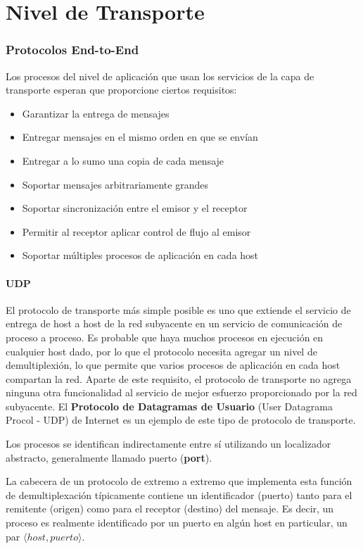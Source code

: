 \part{Nivel de Transporte}
\section{Protocolos End-to-End}
Los procesos del nivel de aplicación que usan los servicios de la capa de transporte esperan que proporcione ciertos requisitos:
\begin{itemize}
  \item Garantizar la entrega de mensajes
  \item Entregar mensajes en el mismo orden en que se envían
  \item Entregar a lo sumo una copia de cada mensaje
  \item Soportar mensajes arbitrariamente grandes
  \item Soportar sincronización entre el emisor y el receptor
  \item Permitir al receptor aplicar control de flujo al emisor
  \item Soportar múltiples procesos de aplicación en cada host  
\end{itemize}
\subsection{UDP}
El protocolo de transporte más simple posible es uno que extiende el servicio de entrega de host a host de la red subyacente en un servicio de comunicación de proceso a proceso. Es probable que haya muchos procesos en ejecución en cualquier host dado, por lo que el protocolo necesita agregar un nivel de demultiplexión, lo que permite que varios procesos de aplicación en cada host compartan la red. Aparte de este requisito, el protocolo de transporte no agrega ninguna otra funcionalidad al servicio de mejor esfuerzo proporcionado por la red subyacente. El \textbf{Protocolo de Datagramas de Usuario} (User Datagrama Procol - UDP) de Internet es un ejemplo de este tipo de protocolo de transporte.

Los procesos se identifican indirectamente entre sí utilizando un localizador abstracto, generalmente llamado puerto (\textbf{port}).

La cabecera de un protocolo de extremo a extremo que implementa esta función de demultiplexación típicamente contiene un identificador (puerto) tanto para el remitente (origen) como para el receptor (destino) del mensaje. Es decir, un proceso es realmente identificado por un puerto en algún host en particular, un par \(\langle host, puerto\rangle\).

